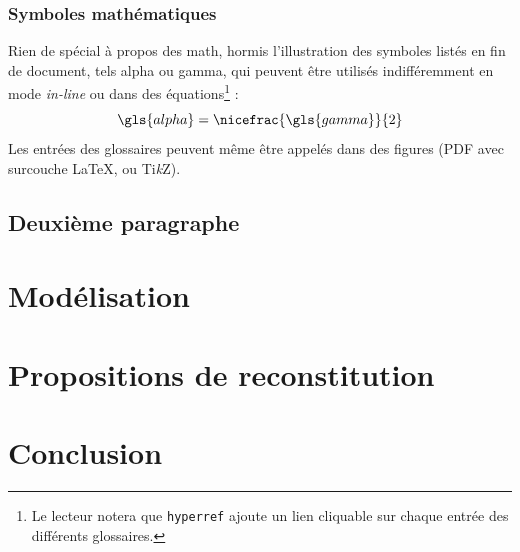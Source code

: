 			\subsection{Symboles mathématiques}
			Rien de spécial à propos des math, hormis l'illustration des symboles listés en fin de document, tels \gls{alpha} ou \gls{gamma}, qui peuvent être utilisés indifféremment 			en mode \emph{in-line} ou dans des équations\footnote{Le lecteur notera que \texttt{hyperref} ajoute un lien cliquable sur chaque entrée des différents glossaires.} :
			\begin{equation}
				\gls{alpha}=\nicefrac{\gls{gamma}}{2}
				\label{eq:alphagamma}
			\end{equation}
			Les entrées des glossaires peuvent même être appelés dans des figures (PDF avec surcouche \LaTeX, ou Ti\textit{k}Z).
	

		\section{Deuxième paragraphe}
			\blindtext




	\chapter{Modélisation}
		\minitoc
		\newpage
		
	\chapter{Propositions de reconstitution}
		\minitoc
		\newpage
		
	\chapter*{Conclusion}
		\newpage
			
 
 


